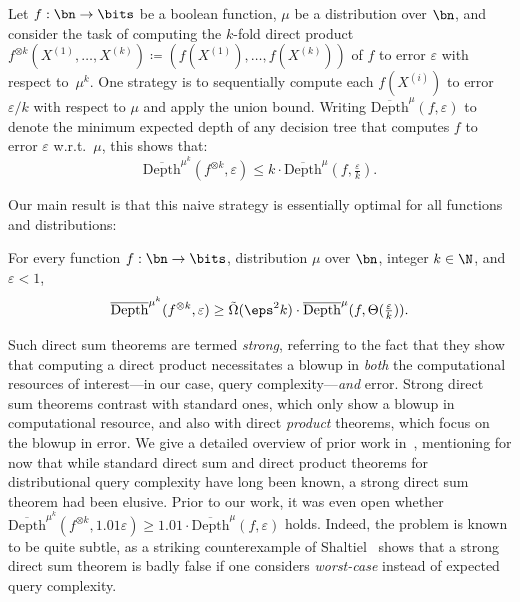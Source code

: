 \documentclass[11pt]{article}
\newcommand{\lnote}[1]{\footnote{{\bf \color{blue}Li-Yang}: {#1}}}
\begin{document}
Let $f: \bn \to \bits$  be a boolean function, $\mu$ be a distribution over $\bn$, and consider the task of computing the $k$-fold direct product $f^{\otimes k}(X^{(1)},\ldots,X^{(k)}) \coloneqq (f(X^{(1)}),\ldots,f(X^{(k)}))$ of $f$ to error $\varepsilon$ with respect to~$\mu^k$. One strategy is to sequentially compute each $f(X^{(i)})$ to error $\varepsilon/k$ with respect to $\mu$ and apply the union bound. Writing $\overline{\mathrm{Depth}}^{\mu}(f,\varepsilon)$ to denote the minimum expected depth of any decision tree that computes $f$ to error $\varepsilon$ w.r.t.~$\mu$, this shows that: %
\begin{equation*}
\overline{\mathrm{Depth}}^{\mu^k}(f^{\otimes k},\varepsilon) \le k \cdot \overline{\mathrm{Depth}}^{\mu}(f,\tfrac{\varepsilon}{k}).
\label{eq:naive upper bound}
\end{equation*}

Our main result is that this naive strategy is essentially optimal for all functions and distributions:\medskip 

\begin{tcolorbox}[colback = white,arc=1mm, boxrule=0.25mm]
\begin{theorem}
\label{thm:main-intro}
For every function $f: \bn \to \bits$, distribution $\mu$  over $\bn$, integer $k \in \N$, and $\varepsilon < 1$, 
\[ \overline{\mathrm{Depth}}^{\mu^k}(f^{\otimes k},\varepsilon) \ge \tilde{\Omega}(\eps^2k) \cdot \overline{\mathrm{Depth}}^{\mu}(f,\Theta(\tfrac{\varepsilon}{k})).\]
\end{theorem}
\end{tcolorbox}
\medskip 

Such direct sum theorems are termed {\sl strong}, referring to the fact that they show that computing a direct product necessitates a blowup in {\sl both} the computational resources of interest---in our case, query complexity---{\sl and} error. Strong direct sum theorems contrast with standard ones, which only show a blowup in computational resource, and also with direct {\sl product} theorems, which focus  on the blowup in error. We give a detailed overview of prior work in~, mentioning for now that while standard direct sum and direct product theorems for distributional query complexity have long been known, a strong direct sum theorem had been elusive.  Prior to our work, it was even open whether 
$\overline{\mathrm{Depth}}^{\mu^k}(f^{\otimes k},1.01\varepsilon) \ge 1.01 \cdot \overline{\mathrm{Depth}}^{\mu}(f,\varepsilon)$ holds. Indeed, the problem is known to be quite subtle, as a striking counterexample of Shaltiel~\cite{Sha04} shows that a strong direct sum
theorem is badly false if one considers {\sl worst-case} instead of expected query complexity. 
\end{document}
